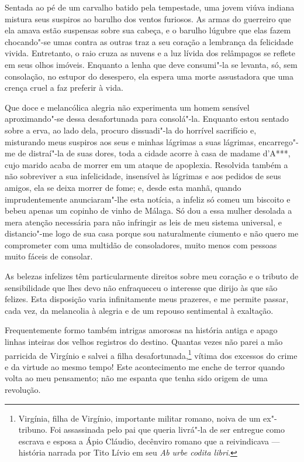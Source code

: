  Sentada ao pé de um carvalho batido pela tempestade, uma jovem viúva
indiana mistura seus suspiros ao barulho dos ventos furiosos. As armas
do guerreiro que ela amava estão suspensas sobre sua cabeça, e o
barulho lúgubre que elas fazem chocando"-se umas contra as outras traz a
seu coração a lembrança da felicidade vivida. Entretanto, o raio cruza
as nuvens e a luz lívida dos relâmpagos se reflete em seus olhos
imóveis.  Enquanto a lenha que deve consumi"-la se levanta, só, sem
consolação, no estupor do desespero, ela espera uma morte assustadora
que uma crença cruel a faz preferir à vida. 

 Que doce e melancólica alegria não experimenta um homem sensível
aproximando"-se dessa desafortunada para consolá"-la. Enquanto estou
sentado sobre a erva, ao lado dela, procuro dissuadi"-la do horrível
sacrifício e, misturando meus suspiros aos seus e minhas lágrimas a
suas lágrimas, encarrego"-me de distraí"-la de suas dores, toda a cidade
acorre à casa de madame d’A***, cujo marido acaba de morrer em um
ataque de apoplexia. Resolvida também a não sobreviver a sua
infelicidade, insensível às lágrimas e aos pedidos de seus amigos, ela
se deixa morrer de fome; e, desde esta manhã, quando imprudentemente
anunciaram"-lhe esta notícia, a infeliz só comeu um biscoito e bebeu
apenas um copinho de vinho de Málaga. Só dou a essa mulher desolada a
mera atenção necessária para não infringir as leis de meu sistema
universal, e distancio"-me logo de sua casa porque sou naturalmente
ciumento e não quero me comprometer com uma multidão de consoladores,
muito menos com pessoas muito fáceis de consolar.

 As belezas infelizes têm particularmente direitos sobre meu coração e o
tributo de sensibilidade que lhes devo não enfraqueceu o interesse que
dirijo às que são felizes. Esta disposição varia infinitamente meus
prazeres, e me permite passar, cada vez, da melancolia à alegria e de
um repouso sentimental à exaltação.

 Frequentemente formo também intrigas amorosas na história antiga e
apago linhas inteiras dos velhos registros do destino. Quantas vezes
não parei a mão parricida de Virgínio e salvei a filha
desafortunada,\footnote{ Virgínia, filha de Virgínio, importante militar
romano, noiva de um ex"-tribuno. Foi assassinada pelo pai que queria
livrá"-la de ser entregue como escrava e esposa a Ápio Cláudio,
decênviro romano que a reivindicava --- história narrada por Tito Lívio
em seu \textit{Ab urbe codita libri}.} vítima dos excessos do
crime e da virtude ao mesmo tempo! Este acontecimento me enche de
terror quando volta ao meu pensamento; não me espanta que tenha sido
origem de uma revolução. 

